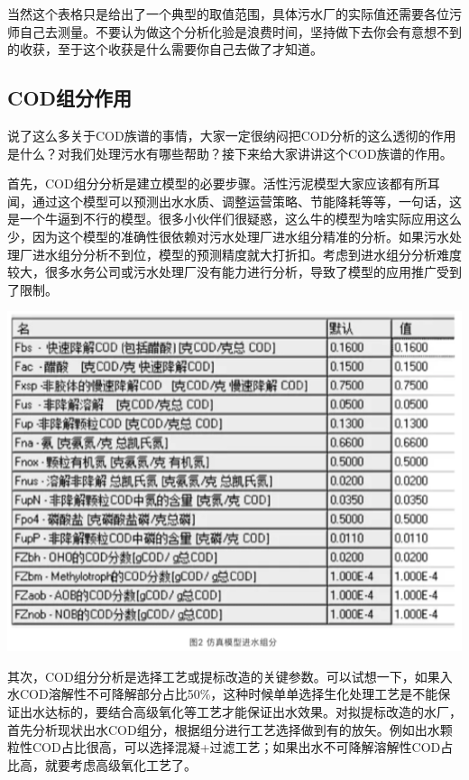 \documentclass[]{book}
\begin{document}
当然这个表格只是给出了一个典型的取值范围，具体污水厂的实际值还需要各位污师自己去测量。不要认为做这个分析化验是浪费时间，坚持做下去你会有意想不到的收获，至于这个收获是什么需要你自己去做了才知道。

\hypertarget{codux7ec4ux5206ux4f5cux7528}{%
\subsection{COD组分作用}\label{codux7ec4ux5206ux4f5cux7528}}

说了这么多关于COD族谱的事情，大家一定很纳闷把COD分析的这么透彻的作用是什么？对我们处理污水有哪些帮助？接下来给大家讲讲这个COD族谱的作用。

首先，COD组分分析是建立模型的必要步骤。活性污泥模型大家应该都有所耳闻，通过这个模型可以预测出水水质、调整运营策略、节能降耗等等，一句话，这是一个牛逼到不行的模型。很多小伙伴们很疑惑，这么牛的模型为啥实际应用这么少，因为这个模型的准确性很依赖对污水处理厂进水组分精准的分析。如果污水处理厂进水组分分析不到位，模型的预测精度就大打折扣。考虑到进水组分分析难度较大，很多水务公司或污水处理厂没有能力进行分析，导致了模型的应用推广受到了限制。

\includegraphics[width=6.67in]{images/cod4}

其次，COD组分分析是选择工艺或提标改造的关键参数。可以试想一下，如果入水COD溶解性不可降解部分占比50\%，这种时候单单选择生化处理工艺是不能保证出水达标的，要结合高级氧化等工艺才能保证出水效果。对拟提标改造的水厂，首先分析现状出水COD组分，根据组分进行工艺选择做到有的放矢。例如出水颗粒性COD占比很高，可以选择混凝+过滤工艺；如果出水不可降解溶解性COD占比高，就要考虑高级氧化工艺了。
\end{document}
